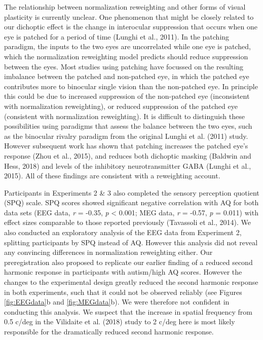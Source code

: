 \documentclass[
]{article}
\begin{document}
The relationship between normalization reweighting and other forms of visual plasticity is currently unclear. One phenomenon that might be closely related to our dichoptic effect is the change in interocular suppression that occurs when one eye is patched for a period of time (Lunghi et al., 2011). In the patching paradigm, the inputs to the two eyes are uncorrelated while one eye is patched, which the normalization reweighting model predicts should reduce suppression between the eyes. Most studies using patching have focussed on the resulting imbalance between the patched and non-patched eye, in which the patched eye contributes more to binocular single vision than the non-patched eye. In principle this could be due to increased suppression of the non-patched eye (inconsistent with normalization reweighting), or reduced suppression of the patched eye (consistent with normalization reweighting). It is difficult to distinguish these possibilities using paradigms that assess the balance between the two eyes, such as the binocular rivalry paradigm from the original Lunghi et al. (2011) study. However subsequent work has shown that patching increases the patched eye's response (Zhou et al., 2015), and reduces both dichoptic masking (Baldwin and Hess, 2018) and levels of the inhibitory neurotransmitter GABA (Lunghi et al., 2015). All of these findings are consistent with a reweighting account.

Participants in Experiments 2 \& 3 also completed the sensory perception quotient (SPQ) scale. SPQ scores showed significant negative correlation with AQ for both data sets (EEG data, \emph{r} = -0.35, \emph{p} \textless{} 0.001; MEG data, \emph{r} = -0.57, \emph{p} = 0.011) with effect sizes comparable to those reported previously (Tavassoli et al., 2014). We also conducted an exploratory analysis of the EEG data from Experiment 2, splitting participants by SPQ instead of AQ. However this analysis did not reveal any convincing differences in normalization reweighting either. Our preregistration also proposed to replicate our earlier finding of a reduced second harmonic response in participants with autism/high AQ scores. However the changes to the experimental design greatly reduced the second harmonic response in both experiments, such that it could not be observed reliably (see Figures \ref{fig:EEGdata}b and \ref{fig:MEGdata}b). We were therefore not confident in conducting this analysis. We suspect that the increase in spatial frequency from 0.5 c/deg in the Vilidaite et al. (2018) study to 2 c/deg here is most likely responsible for the dramatically reduced second harmonic response.
\end{document}
